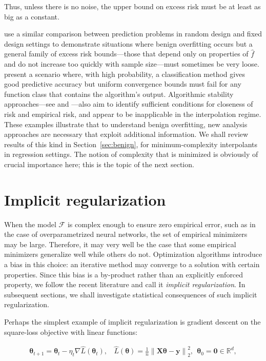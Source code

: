 Thus, unless there is no noise, the upper bound on excess risk must be at least as big as a constant.

\cite{bartlett2020failures} use a similar comparison between prediction problems in random design and fixed design settings to demonstrate situations where benign overfitting occurs but a general family of excess risk bounds---those that depend only on properties of $\widehat f$ and do not increase too quickly with sample size---must sometimes be very loose. \cite{nk-ucmuegdl-19} present a scenario where, with high probability, a classification method gives good predictive accuracy but uniform convergence bounds must fail for any function class that contains the algorithm's output.  Algorithmic stability approaches---see \cite{devroye1979distribution} and \cite{bousquet2002stability}---also aim to identify sufficient conditions for closeness of risk and empirical risk, and appear to be inapplicable in the interpolation regime.  These examples illustrate that to understand benign overfitting, new analysis approaches are necessary that exploit additional information.  We shall review results of this kind in
Section~\ref{sec:benign}, for minimum-complexity interpolants in regression settings. The notion of complexity that is minimized is obviously of crucial importance here; this is the topic of the next section.

\section{Implicit regularization}
\label{sec:implicit}

When the model ${\mathcal F}$ is complex enough to ensure zero empirical error, such as in the case of overparametrized neural networks, the set of empirical minimizers may be large. Therefore, it may very well be the case that some empirical minimizers generalize well while others do not. Optimization algorithms introduce a bias in this choice: an iterative method may converge to a solution with certain properties. Since this bias is a by-product rather than an explicitly enforced property, we follow the recent literature and call it \emph{implicit regularization}. In subsequent sections, we shall investigate statistical consequences of such implicit regularization. 

Perhaps the simplest example of implicit regularization is gradient descent on the square-loss objective with linear functions:

\begin{align}
	\label{eq:grad_descent_square_loss_linear}
	{\boldsymbol \theta}_{t+1} = {\boldsymbol \theta}_t - \eta_t \nabla \widehat{L}({\boldsymbol \theta}_t),~~~~ \widehat{L}({\boldsymbol \theta})= \frac{1}{n}\left\|{\boldsymbol X} {\boldsymbol \theta}-{\boldsymbol y}\right\|^2_2,~~ {\boldsymbol \theta}_0=\boldsymbol{0}\in{\mathbb R}^d,
\end{align}

